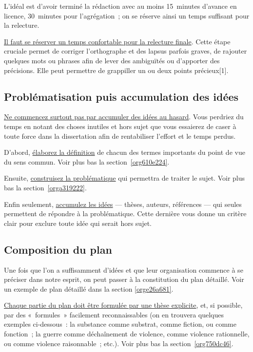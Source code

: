 \documentclass[a4paper,12pt]{article}
\begin{document}
L'idéal est d'avoir terminé la rédaction avec au moins 15 minutes
d'avance en licence, 30 minutes pour l'agrégation ; on se réserve ainsi
un temps suffisant pour la relecture. 

\uline{Il faut se réserver un temps confortable pour la relecture finale}.
Cette étape cruciale permet de corriger l'orthographe et des lapsus
parfois graves, de rajouter quelques mots ou phrases afin de lever des
ambiguïtés ou d'apporter des précisions. Elle peut permettre de
grappiller un ou deux points précieux[1].

\subsection{Problématisation puis accumulation des idées}
\label{sec:org07758d6}

\uline{Ne commencez surtout pas par accumuler des idées au hasard}. Vous
perdriez du temps en notant des choses inutiles et hors sujet que vous
essaierez de caser à toute force dans la dissertation afin de
rentabiliser l'effort et le temps perdus.

D'abord, \uline{élaborez la définition} de chacun des termes importants du
point de vue du sens commun. Voir plus bas la section \ref{org610e224}.

Ensuite, \uline{construisez la problématique} qui permettra de traiter le
sujet. Voir plus bas la section \ref{orga319222}.

Enfin seulement, \uline{accumulez les idées} --- thèses, auteurs, références
--- qui seules permettent de répondre à la problématique. Cette dernière
vous donne un critère clair pour exclure toute idée qui serait hors
sujet.


\subsection{Composition du plan}
\label{sec:org252122f}

Une fois que l'on a suffisamment d'idées et que leur organisation
commence à se préciser dans notre esprit, on peut passer à la
constitution du plan détaillé. Voir un exemple de plan détaillé dans la
section \ref{orge26a681}.

\uline{Chaque partie du plan doit être formulée par une thèse explicite}, et,
si possible, par des « formules » facilement reconnaissables (on en
trouvera quelques exemples ci-dessous : la substance comme substrat,
comme fiction, ou comme fonction ; la guerre comme déchaînement de
violence, comme violence rationnelle, ou comme violence raisonnable ;
etc.). Voir plus bas la section \ref{org750dc46}.
\end{document}
